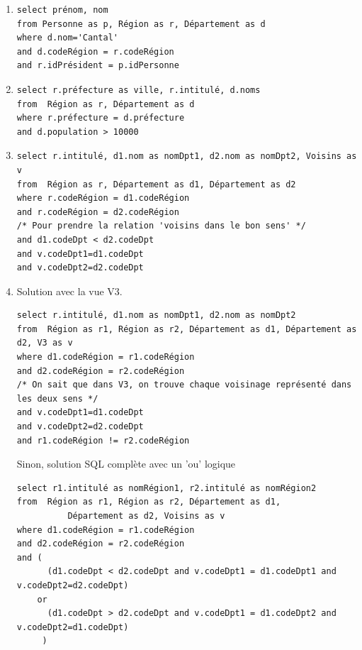 \begin{solution}


\begin{enumerate}
  \item 
\begin{verbatim}
select prénom, nom
from Personne as p, Région as r, Département as d
where d.nom='Cantal'
and d.codeRégion = r.codeRégion
and r.idPrésident = p.idPersonne
\end{verbatim}

  \item 
\begin{verbatim}
select r.préfecture as ville, r.intitulé, d.noms
from  Région as r, Département as d
where r.préfecture = d.préfecture
and d.population > 10000
\end{verbatim}


  \item 
\begin{verbatim}
select r.intitulé, d1.nom as nomDpt1, d2.nom as nomDpt2, Voisins as v
from  Région as r, Département as d1, Département as d2
where r.codeRégion = d1.codeRégion
and r.codeRégion = d2.codeRégion
/* Pour prendre la relation 'voisins dans le bon sens' */
and d1.codeDpt < d2.codeDpt
and v.codeDpt1=d1.codeDpt
and v.codeDpt2=d2.codeDpt
\end{verbatim}

\item Solution avec la vue V3.
\begin{verbatim}
select r.intitulé, d1.nom as nomDpt1, d2.nom as nomDpt2
from  Région as r1, Région as r2, Département as d1, Département as d2, V3 as v
where d1.codeRégion = r1.codeRégion
and d2.codeRégion = r2.codeRégion
/* On sait que dans V3, on trouve chaque voisinage représenté dans les deux sens */
and v.codeDpt1=d1.codeDpt
and v.codeDpt2=d2.codeDpt
and r1.codeRégion != r2.codeRégion
\end{verbatim}

Sinon, solution SQL complète avec un 'ou' logique
\begin{verbatim}
select r1.intitulé as nomRégion1, r2.intitulé as nomRégion2
from  Région as r1, Région as r2, Département as d1, 
          Département as d2, Voisins as v
where d1.codeRégion = r1.codeRégion
and d2.codeRégion = r2.codeRégion
and ( 
      (d1.codeDpt < d2.codeDpt and v.codeDpt1 = d1.codeDpt1 and v.codeDpt2=d2.codeDpt)
    or
      (d1.codeDpt > d2.codeDpt and v.codeDpt1 = d1.codeDpt2 and v.codeDpt2=d1.codeDpt)
     )
\end{verbatim}


\end{enumerate}
\end{solution}
